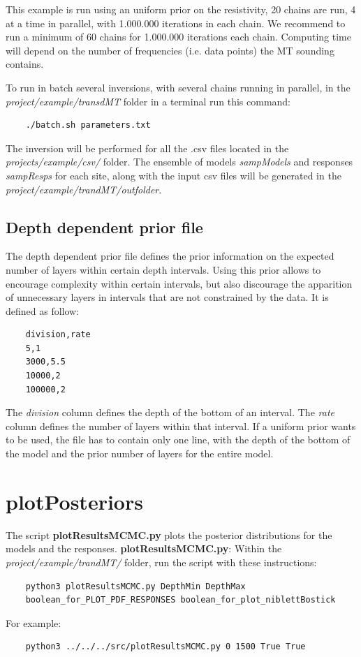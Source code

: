 \documentclass[]{scrartcl}
\begin{document}
	This example is run using an uniform prior on the resistivity, 20 chains are run, 4 at a time in parallel, with 1.000.000 iterations in each chain.   
    We recommend to run a minimum of 60 chains for 1.000.000 iterations each chain. Computing time will depend on the number of frequencies (i.e. data points) the MT sounding contains.


	\bigbreak
	To run in batch several inversions, with several chains running in parallel, in  the \textit{project/example/transdMT} folder in a terminal run this command:
	\begin{verbatim}
	./batch.sh parameters.txt 
	\end{verbatim} 

	The inversion will be performed for all the .csv files located in the \textit{projects/example/csv/} folder. 	
	The ensemble of models \textit{sampModels} and responses \textit{sampResps} for each site, along with the input csv files will be generated in the \textit{project/example/trandMT/outfolder}.	
	
	
	\subsection{Depth dependent prior file}
	
	The depth dependent prior file defines the prior information on the expected number of layers within certain depth intervals. Using this prior allows to encourage complexity within certain intervals, but also discourage the apparition of unnecessary layers in intervals that are not constrained by the data. It is defined as follow:
	
	\begin{verbatim}
	division,rate
	5,1
	3000,5.5
	10000,2
	100000,2
	\end{verbatim} 

    The \textit{division} column defines the depth of the bottom of an interval. The \textit{rate} column defines the number of layers within that interval. If a uniform prior wants to be used, the file has to contain only one line, with the depth of the bottom of the model and the prior number of layers for the entire model. 
	
	
	
	
	
	
	
    \section{plotPosteriors} 	
	The script \textbf{plotResultsMCMC.py} plots the posterior distributions for the models and the responses. 
	\bigbreak
	\textbf{plotResultsMCMC.py}: Within the \textit{project/example/trandMT/} folder, run the script with these instructions:
	\begin{verbatim}	
	python3 plotResultsMCMC.py DepthMin DepthMax
	boolean_for_PLOT_PDF_RESPONSES boolean_for_plot_niblettBostick
	\end{verbatim} 
	For example:
	\begin{verbatim}
	python3 ../../../src/plotResultsMCMC.py 0 1500 True True
	\end{verbatim}
	
\end{document}
